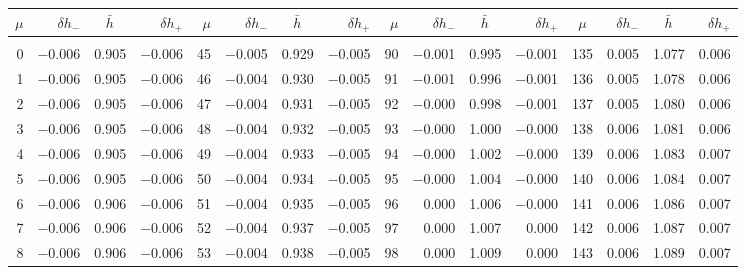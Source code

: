 \clearpage
\begin{table}[!h]\centering
\vspace{0.25cm}
\scriptsize{ \begin{tabular}{rrrr|rrrr|rrrr|crrr}
$\mu$ & $\delta h_-$  & $\bar{h}~~~~$ & $\delta h_+$ &
$\mu$ & $\delta h_-$  & $\bar{h}~~~~$ & $\delta h_+$ &
$\mu$ & $\delta h_-$  & $\bar{h}~~~~$ & $\delta h_+$ &
$\mu$ & $\delta h_-$  & $\bar{h}~~~~$ & $\delta h_+$ \\\hline
&&&&&&&&&&&&&&&\\[-1.75ex]
  0 & \tiny{ $-$0.006} &   0.905 & \tiny{ $-$0.006} &  45 & \tiny{ $-$0.005} &   0.929 & \tiny{ $-$0.005} &  90 & \tiny{ $-$0.001} &   0.995 & \tiny{ $-$0.001} & 135 & \tiny{  0.005} &   1.077 & \tiny{  0.006}\\
  1 & \tiny{ $-$0.006} &   0.905 & \tiny{ $-$0.006} &  46 & \tiny{ $-$0.004} &   0.930 & \tiny{ $-$0.005} &  91 & \tiny{ $-$0.001} &   0.996 & \tiny{ $-$0.001} & 136 & \tiny{  0.005} &   1.078 & \tiny{  0.006}\\
  2 & \tiny{ $-$0.006} &   0.905 & \tiny{ $-$0.006} &  47 & \tiny{ $-$0.004} &   0.931 & \tiny{ $-$0.005} &  92 & \tiny{ $-$0.000} &   0.998 & \tiny{ $-$0.001} & 137 & \tiny{  0.005} &   1.080 & \tiny{  0.006}\\
  3 & \tiny{ $-$0.006} &   0.905 & \tiny{ $-$0.006} &  48 & \tiny{ $-$0.004} &   0.932 & \tiny{ $-$0.005} &  93 & \tiny{ $-$0.000} &   1.000 & \tiny{ $-$0.000} & 138 & \tiny{  0.006} &   1.081 & \tiny{  0.006}\\
  4 & \tiny{ $-$0.006} &   0.905 & \tiny{ $-$0.006} &  49 & \tiny{ $-$0.004} &   0.933 & \tiny{ $-$0.005} &  94 & \tiny{ $-$0.000} &   1.002 & \tiny{ $-$0.000} & 139 & \tiny{  0.006} &   1.083 & \tiny{  0.007}\\
  5 & \tiny{ $-$0.006} &   0.905 & \tiny{ $-$0.006} &  50 & \tiny{ $-$0.004} &   0.934 & \tiny{ $-$0.005} &  95 & \tiny{ $-$0.000} &   1.004 & \tiny{ $-$0.000} & 140 & \tiny{  0.006} &   1.084 & \tiny{  0.007}\\
  6 & \tiny{ $-$0.006} &   0.906 & \tiny{ $-$0.006} &  51 & \tiny{ $-$0.004} &   0.935 & \tiny{ $-$0.005} &  96 & \tiny{  0.000} &   1.006 & \tiny{ $-$0.000} & 141 & \tiny{  0.006} &   1.086 & \tiny{  0.007}\\
  7 & \tiny{ $-$0.006} &   0.906 & \tiny{ $-$0.006} &  52 & \tiny{ $-$0.004} &   0.937 & \tiny{ $-$0.005} &  97 & \tiny{  0.000} &   1.007 & \tiny{  0.000} & 142 & \tiny{  0.006} &   1.087 & \tiny{  0.007}\\
  8 & \tiny{ $-$0.006} &   0.906 & \tiny{ $-$0.006} &  53 & \tiny{ $-$0.004} &   0.938 & \tiny{ $-$0.005} &  98 & \tiny{  0.000} &   1.009 & \tiny{  0.000} & 143 & \tiny{  0.006} &   1.089 & \tiny{  0.007}\\

\end{tabular}}
\end{table}
